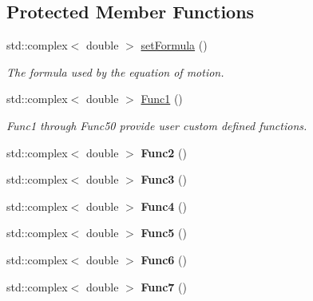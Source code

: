 \subsection*{Protected Member Functions}
\begin{DoxyCompactItemize}
\item 
std\-::complex$<$ double $>$ \hyperlink{classosea_1_1ofreq_1_1_eqn_rotation_a910975e9e2e8d438853a4e7d658850a8}{set\-Formula} ()
\begin{DoxyCompactList}\small\item\em The formula used by the equation of motion. \end{DoxyCompactList}\item 
std\-::complex$<$ double $>$ \hyperlink{classosea_1_1ofreq_1_1_eqn_rotation_aac7de76e4a8da885b4c06f9e694afff1}{Func1} ()
\begin{DoxyCompactList}\small\item\em Func1 through Func50 provide user custom defined functions. \end{DoxyCompactList}\item 
\hypertarget{classosea_1_1ofreq_1_1_eqn_rotation_a6287a211f6758d536848dab92d18e081}{std\-::complex$<$ double $>$ {\bfseries Func2} ()}\label{classosea_1_1ofreq_1_1_eqn_rotation_a6287a211f6758d536848dab92d18e081}

\item 
\hypertarget{classosea_1_1ofreq_1_1_eqn_rotation_abfad91e6b9cffc60a6e85ea6a46ff64d}{std\-::complex$<$ double $>$ {\bfseries Func3} ()}\label{classosea_1_1ofreq_1_1_eqn_rotation_abfad91e6b9cffc60a6e85ea6a46ff64d}

\item 
\hypertarget{classosea_1_1ofreq_1_1_eqn_rotation_a93e98c20eda7e3f040c4ac354ec82a74}{std\-::complex$<$ double $>$ {\bfseries Func4} ()}\label{classosea_1_1ofreq_1_1_eqn_rotation_a93e98c20eda7e3f040c4ac354ec82a74}

\item 
\hypertarget{classosea_1_1ofreq_1_1_eqn_rotation_a67b54733dbeed8cc6ec5a18ebc4115f8}{std\-::complex$<$ double $>$ {\bfseries Func5} ()}\label{classosea_1_1ofreq_1_1_eqn_rotation_a67b54733dbeed8cc6ec5a18ebc4115f8}

\item 
\hypertarget{classosea_1_1ofreq_1_1_eqn_rotation_acb3797b3ec3fb5d2fdccfe6ee800e470}{std\-::complex$<$ double $>$ {\bfseries Func6} ()}\label{classosea_1_1ofreq_1_1_eqn_rotation_acb3797b3ec3fb5d2fdccfe6ee800e470}

\item 
\hypertarget{classosea_1_1ofreq_1_1_eqn_rotation_a39df2d7a20142545d67b95bc73c7f477}{std\-::complex$<$ double $>$ {\bfseries Func7} ()}\label{classosea_1_1ofreq_1_1_eqn_rotation_a39df2d7a20142545d67b95bc73c7f477}


\end{DoxyCompactItemize}
